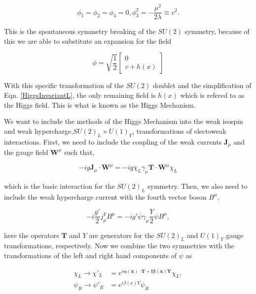 \begin{equation}
\phi_1=\phi_2=\phi_4=0, \phi_3^2=-\frac{\mu^2}{2\lambda}\equiv v^2.
\end{equation}

This is the spontaneous symmetry breaking of the $SU(2)$ symmetry, because of this we are able to substitute an expansion for the field

\begin{equation}
\phi=\sqrt{\frac{1}{2}}
\begin{bmatrix}
0 \\
v+h(x)
\end{bmatrix}
\end{equation}

With this specific transformation of the $SU(2)$ doublet and the simplification of Eqn. \ref{HiggsInvariantL}, the only remaining field is $h(x)$ which is refered to as the Higgs field. This is what is known as the Higgs Mechanism. 

We want to include the methods of the Higgs Mechanism into the weak isospin and weak hypercharge,$SU(2)_L\times U(1)_Y$, transformations of electoweak interactions. First, we need to include the coupling of the weak currents $\boldsymbol{J}_\mu$ and the gauge field $\boldsymbol{W}^\mu$ such that,

\begin{equation}
-ig\boldsymbol{J}_\mu\cdot\boldsymbol{W}^\mu=-ig\overline{\chi}_L\gamma_\mu\boldsymbol{T}\cdot\boldsymbol{W}^\mu\chi_L
\end{equation}

which is the basic interaction for the $SU(2)_L$ symmetry. Then, we also need to include the weak hypercharge current with the fourth vector boson $B^\mu$,

\begin{equation}
-i\frac{g'}{2}j_\mu^YB^\mu=-ig'\overline{\psi}\gamma_\mu\frac{Y}{2}\psi B^\mu, 
\end{equation}

here the operators $\boldsymbol{T}$ and $Y$ are generators for the $SU(2)_L$ and $U(1)_Y$ gauge transformations, respectively. Now we combine the two symmetries with the transformations of the left and right hand components of $\psi$ as

\begin{equation}
\begin{split}
\chi_L\rightarrow\chi'_L&=e^{i\boldsymbol{\alpha(x)\cdot T+i\beta(x)Y}}\chi_L, \\
\psi_R\rightarrow\psi'_R&=e^{i\beta(x)Y}\psi_R
\end{split}
\end{equation}


